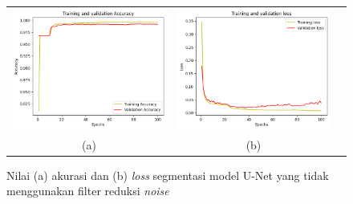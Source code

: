 \begin{enumerate}
	
	\begin{figure}[h]
		\centering
		\begin{tabular}{ccc}
			\includegraphics[scale=0.5]{bab4/acc-ori-unet.png} & 
			\includegraphics[scale=0.5]{bab4/loss-ori-unet.png} & \\
			(a) & (b)    %
		\end{tabular}
		\caption{Nilai (a) akurasi dan (b) \textit{loss} segmentasi model U-Net yang tidak menggunakan filter reduksi \textit{noise}}
		\label{fig:performance-ori-unet}
	\end{figure}
	

\end{enumerate}
